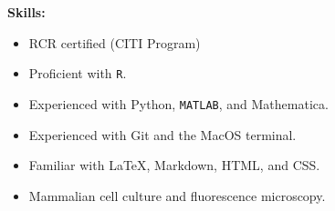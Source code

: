 \textbf{Skills:}

\begin{itemize}[noitemsep]
\item RCR certified (CITI Program)
\item Proficient with \texttt{R}.
\item Experienced with Python, \texttt{MATLAB}, and Mathematica.
\item Experienced with Git and the MacOS terminal. 
\item Familiar with \LaTeX{}, Markdown, HTML, and CSS.
\item Mammalian cell culture and fluorescence microscopy. 
\end{itemize}